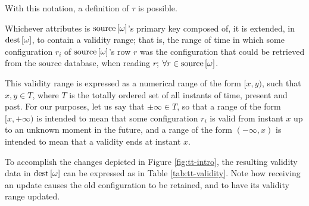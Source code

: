With this notation, a definition of $\tau$ is possible.

\begin{definition}\label{def:tau}
	Whichever attributes is $\text{source}\left[{\omega}\right]$'s primary key composed of, it is extended, in $\text{dest}\left[{\omega}\right]$, to contain a validity range; that is, the range of time in which some configuration $r_i$ of $\text{source}\left[{\omega}\right]$'s row $r$ was the configuration that could be retrieved from the source database, when reading $r$; $\forall r \in \text{source}\left[{\omega}\right]$.
\end{definition}

This validity range is expressed as a numerical range of the form $[x, y)$, such that $x, y \in T$, where $T$ is the totally ordered set of all instants of time, present and past.
For our purposes, let us say that $\pm\infty \in T$, so that a range of the form $[x, +\infty)$ is intended to mean that some configuration $r_i$ is valid from instant $x$ up to an unknown moment in the future, and a range of the form $(-\infty, x)$ is intended to mean that a validity ends at instant $x$.

\begin{example}
	To accomplish the changes depicted in Figure \ref{fig:tt-intro}, the resulting validity data in $\text{dest}\left[{\omega}\right]$ can be expressed as in Table \ref{tab:tt-validity}.
	Note how receiving an update causes the old configuration to be retained, and to have its validity range updated.
\end{example}

